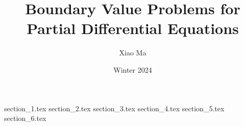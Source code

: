 \documentclass{article}
\title{Boundary Value Problems for Partial Differential Equations}
\author{Xiao Ma}
\date{Winter 2024}
\theoremstyle{remark}
\numberwithin{equation}{section}
\begin{document}
\maketitle

{section_1.tex}
{section_2.tex}
{section_3.tex}
{section_4.tex}
{section_5.tex}
{section_6.tex}
\end{document}
